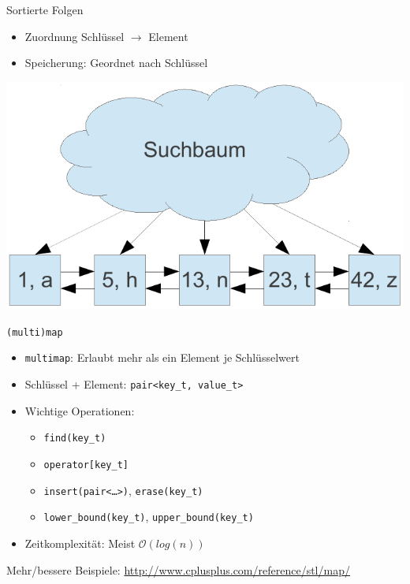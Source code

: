 \begin{frame}{Sortierte Folgen}
	\begin{itemize}
		\item Zuordnung Schlüssel $\rightarrow$ Element
		\item Speicherung: Geordnet nach Schlüssel
	\end{itemize}
	\begin{center}
		\includegraphics[width=0.7\linewidth]{images/sorted_sequence.pdf}
	\end{center}
\end{frame}

\begin{frame}{\texttt{(multi)map}}
	\begin{itemize}
		\item \texttt{multimap}: Erlaubt mehr als ein Element je Schlüsselwert
		\item Schlüssel + Element: \texttt{pair<key\_t, value\_t>}
		\pause
		\item Wichtige Operationen:
		\begin{itemize}
			\item \texttt{find(key\_t)}
			\item \texttt{operator[key\_t]}
			\item \texttt{insert(pair<\dots>)}, \texttt{erase(key\_t)}
			\item \texttt{lower\_bound(key\_t)}, \texttt{upper\_bound(key\_t)}
		\end{itemize}
		\pause
		\item Zeitkomplexität: Meist $\mathcal{O}(log(n))$
	\end{itemize}
	
	\pause
	
	\pause
	
	Mehr/bessere Beispiele: \url{http://www.cplusplus.com/reference/stl/map/}
\end{frame}

